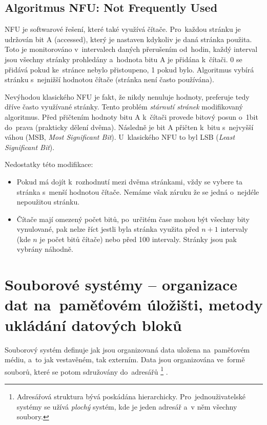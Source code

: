 \subsection{Algoritmus NFU: Not Frequently Used}

NFU je softwarové řešení, které také využívá čítače. Pro~každou stránku je udržován bit A (accessed), který je nastaven kdykoliv je daná stránka použita. Toto je monitorováno v~intervalech daných přerušením od~hodin, každý interval jsou všechny stránky prohledány a~hodnota bitu A je přidána k~čítači. 0 se přidává pokud ke~stránce nebylo přistoupeno, 1 pokud bylo. Algoritmus vybírá stránku s~nejnižší hodnotou čítače (stránka není často používána).

Nevýhodou klasického NFU je fakt, že nikdy nenuluje hodnoty, preferuje tedy dříve často využívané stránky. Tento problém \emph{stárnutí stránek} modifikovaný algoritmus. Před přičtením hodnoty bitu A k~čítači provede bitový posun o~1bit do~prava (prakticky dělení dvěma). Následně je bit A přičten k~bitu s~nejvyšší váhou (MSB, \emph{Most Significant Bit}). U~klasického NFU to byl LSB (\emph{Least Significant Bit}).

Nedostatky této modifikace:

\begin{itemize}
	\item Pokud má dojít k~rozhodnutí mezi dvěma stránkami, vždy se vybere ta stránka s~menší hodnotou čítače. Nemáme však záruku že se jedná o~nejdéle nepoužitou stránku.
	\item Čítače mají omezený počet bitů, po~určitém čase mohou být všechny bity vynulované, pak nelze říct jestli byla stránka využita před $n+1$ intervaly (kde $n$ je počet bitů čítače) nebo před 100 intervaly. Stránky jsou pak vybrány náhodně.
\end{itemize}


\clearpage
\section{Souborové systémy -- organizace dat na~paměťovém úložišti, metody ukládání datových bloků}

Souborový systém definuje jak jsou organizovaná data uložena na~paměťovém médiu, a~to jak vestavěném, tak externím. Data jsou organizována ve~formě souborů, které se potom sdružovány do~adresářů%
\footnote{Adresářová struktura bývá poskádána hierarchicky. Pro~jednouživatelské systémy se užívá \emph{plochý} systém, kde je jeden adresář a~v něm všechny soubory.}%
.


